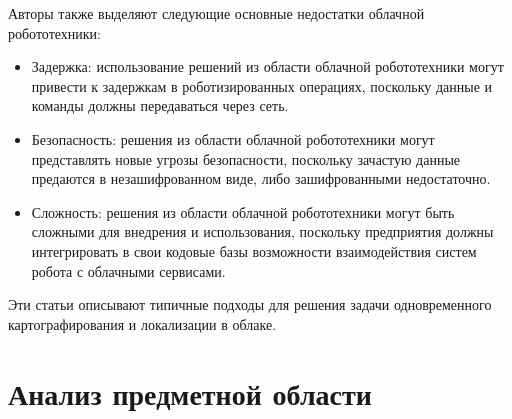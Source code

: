 \documentclass[a4paper, 14pt]{extreport}
\begin{document}
\par\noindent Авторы также выделяют следующие основные недостатки облачной робототехники: 
\begin{itemize}
        \item Задержка: использование решений из области облачной робототехники могут привести к задержкам в роботизированных операциях, поскольку данные и команды должны передаваться через сеть.
        \item Безопасность: решения из области облачной робототехники могут представлять новые угрозы безопасности, поскольку зачастую данные предаются в незашифрованном виде, либо зашифрованными недостаточно.
        \item Сложность: решения из области облачной робототехники могут быть сложными для внедрения и использования, поскольку предприятия должны интегрировать в свои кодовые базы возможности взаимодействия систем робота с облачными сервисами.
\end{itemize}
\par\noindent Эти статьи описывают типичные подходы для решения задачи одновременного картографирования и локализации в облаке.
\chapter{Анализ предметной области}
\end{document}
